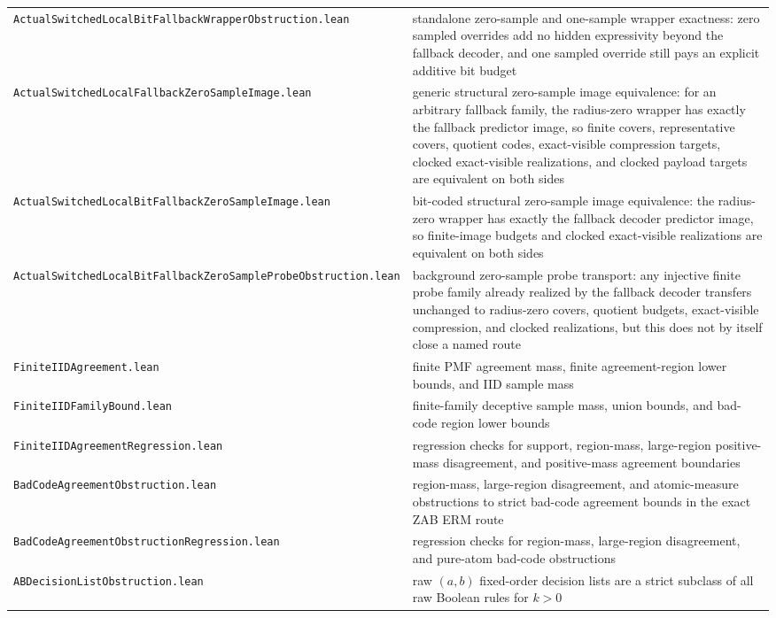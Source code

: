 \documentclass[11pt]{article}
\theoremstyle{remark}
\begin{document}
\begin{center}
\begin{tabular}{ll}
\texttt{ActualSwitchedLocalBitFallbackWrapperObstruction.lean} & standalone zero-sample and one-sample wrapper exactness: zero sampled overrides add no hidden expressivity beyond the fallback decoder, and one sampled override still pays an explicit additive bit budget \\
\texttt{ActualSwitchedLocalFallbackZeroSampleImage.lean} & generic structural zero-sample image equivalence: for an arbitrary fallback family, the radius-zero wrapper has exactly the fallback predictor image, so finite covers, representative covers, quotient codes, exact-visible compression targets, clocked exact-visible realizations, and clocked payload targets are equivalent on both sides \\
\texttt{ActualSwitchedLocalBitFallbackZeroSampleImage.lean} & bit-coded structural zero-sample image equivalence: the radius-zero wrapper has exactly the fallback decoder predictor image, so finite-image budgets and clocked exact-visible realizations are equivalent on both sides \\
\texttt{ActualSwitchedLocalBitFallbackZeroSampleProbeObstruction.lean} & background zero-sample probe transport: any injective finite probe family already realized by the fallback decoder transfers unchanged to radius-zero covers, quotient budgets, exact-visible compression, and clocked realizations, but this does not by itself close a named route \\
\texttt{FiniteIIDAgreement.lean} & finite PMF agreement mass, finite agreement-region lower bounds, and IID sample mass \\
\texttt{FiniteIIDFamilyBound.lean} & finite-family deceptive sample mass, union bounds, and bad-code region lower bounds \\
\texttt{FiniteIIDAgreementRegression.lean} & regression checks for support, region-mass, large-region positive-mass disagreement, and positive-mass agreement boundaries \\
\texttt{BadCodeAgreementObstruction.lean} & region-mass, large-region disagreement, and atomic-measure obstructions to strict bad-code agreement bounds in the exact ZAB ERM route \\
\texttt{BadCodeAgreementObstructionRegression.lean} & regression checks for region-mass, large-region disagreement, and pure-atom bad-code obstructions \\
\texttt{ABDecisionListObstruction.lean} & raw \((a,b)\) fixed-order decision lists are a strict subclass of all raw Boolean rules for \(k>0\) \\

\end{tabular}
\end{center}
\end{document}
